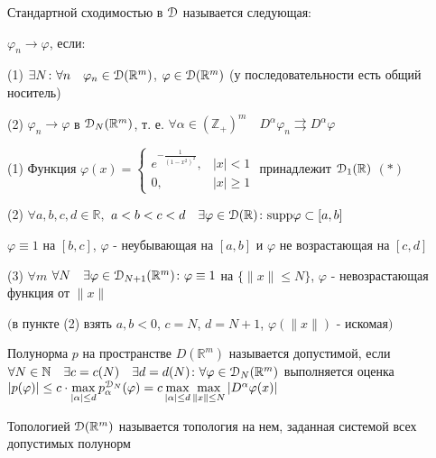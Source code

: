 \documentclass[a4paper,12pt]{report}
\begin{document}
\begin{df}
Стандартной сходимостью в $\EuScript D$ называется следующая: 

$\varphi_n\to\varphi$, если:

(1) $\exists N\colon\forall n\quad\varphi_n\in\EuScript D(\mathbb R^m)$, $\varphi\in\EuScript D(\mathbb R^m)$ (у последовательности есть общий носитель)

(2) $\varphi_n\to\varphi$ в $\EuScript D_N(\mathbb R^m)$, т. е. $\forall\alpha\in(\mathbb Z_+)^m\quad D^\alpha\varphi_n\rightrightarrows D^\alpha\varphi$
\end{df}


\begin{lem}
(1) Функция $\varphi(x)=\begin{cases} e^{-\frac1{(1-x^2)^2}},&|x|<1\\0,&|x|\ge1 \end{cases}$ принадлежит $\EuScript D_1(\mathbb R)$ $(*)$

(2) $\forall a,b,c,d\in\mathbb R,$ $a<b<c<d\quad\exists\varphi\in\EuScript D(\mathbb R)\colon\mathrm{supp}\varphi\subset[a,b]$

$\varphi\equiv1$ на $[b,c]$, $\varphi$ - неубывающая на $[a,b]$ и $\varphi$ не возрастающая на $[c,d]$

(3) $\forall m$ $\forall N\quad\exists\varphi\in\EuScript D_{N+1}(\mathbb R^m)\colon\varphi\equiv1$ на $\{\|x\|\le N\}$, $\varphi$ - невозрастающая функция от $\|x\|$

$\bigr($в пункте (2) взять $a,b<0$, $c=N$, $d=N+1$, $\varphi(\|x\|)$ - искомая$\bigl)$
\end{lem}


\begin{df}
Полунорма $p$ на пространстве $D(\mathbb R^m)$ называется допустимой, если $\forall N\in\mathbb N\quad\exists c=c(N)\quad\exists d=d(N)\colon\forall\varphi\in\EuScript D_N(\mathbb R^m)$ выполняется оценка $|p(\varphi)|\le c\cdot\max\limits_{|\alpha|\le d}p_\alpha^{\EuScript D_N}(\varphi)=c\max\limits_{|\alpha|\le d}\max\limits_{\|x\|\le N}|D^\alpha\varphi(x)|$
\end{df}


\begin{df}
Топологией $\EuScript D(\mathbb R^m)$ называется топология на нем, заданная системой всех допустимых полунорм
\end{df}
\end{document}
